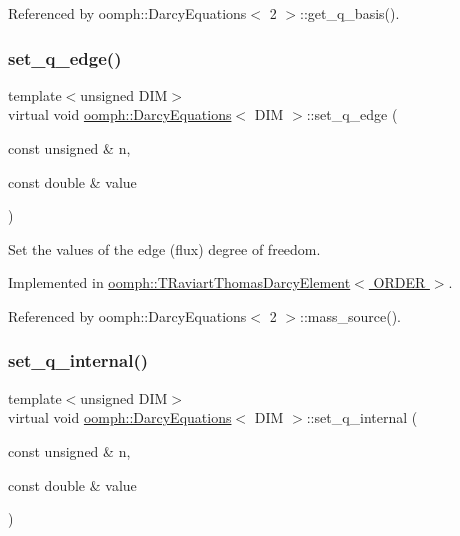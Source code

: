 Referenced by oomph\+::\+Darcy\+Equations$<$ 2 $>$\+::get\+\_\+q\+\_\+basis().

\mbox{\label{classoomph_1_1DarcyEquations_a6e1c3c5e23d71d80b7976e61be0ae8e9}} 
\subsubsection{\texorpdfstring{set\+\_\+q\+\_\+edge()}{set\_q\_edge()}}
{\footnotesize\ttfamily template$<$unsigned D\+IM$>$ \\
virtual void \hyperlink{classoomph_1_1DarcyEquations}{oomph\+::\+Darcy\+Equations}$<$ D\+IM $>$\+::set\+\_\+q\+\_\+edge (\begin{DoxyParamCaption}\item[{const unsigned \&}]{n,  }\item[{const double \&}]{value }\end{DoxyParamCaption})\hspace{0.3cm}{\ttfamily [pure virtual]}}



Set the values of the edge (flux) degree of freedom. 



Implemented in \hyperlink{classoomph_1_1TRaviartThomasDarcyElement_ad4d0783e51faa448cbbd1978bf4779df}{oomph\+::\+T\+Raviart\+Thomas\+Darcy\+Element$<$ O\+R\+D\+E\+R $>$}.



Referenced by oomph\+::\+Darcy\+Equations$<$ 2 $>$\+::mass\+\_\+source().

\mbox{\label{classoomph_1_1DarcyEquations_aafb7955f9dd5b433383ccff10f0fb7a0}} 
\subsubsection{\texorpdfstring{set\+\_\+q\+\_\+internal()}{set\_q\_internal()}}
{\footnotesize\ttfamily template$<$unsigned D\+IM$>$ \\
virtual void \hyperlink{classoomph_1_1DarcyEquations}{oomph\+::\+Darcy\+Equations}$<$ D\+IM $>$\+::set\+\_\+q\+\_\+internal (\begin{DoxyParamCaption}\item[{const unsigned \&}]{n,  }\item[{const double \&}]{value }\end{DoxyParamCaption})\hspace{0.3cm}{\ttfamily [pure virtual]}}



